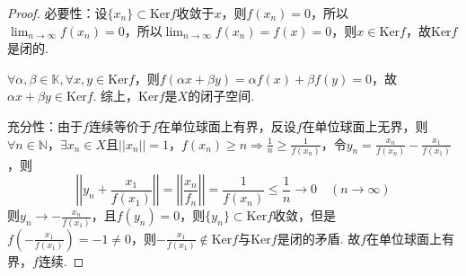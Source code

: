 \documentclass[12pt, a4paper, oneside]{ctexart}
\let\leq=\leqslant %
\let\geq=\geqslant %
\def\N{\mathbb{N}}          %
\def\K{\mathbb{K}}          %
\def\ker{\mathrm{Ker}}      %
\begin{document}
\begin{proof}
    必要性：设$\{x_n\}\subset \ker f$收敛于$x$，则$f(x_n) = 0$，所以$\lim_{n\to\infty}f(x_n) = 0$，所以$\lim_{n\to\infty}f(x_n) = f(x) = 0$，则$x\in \ker f$，故$\ker f$是闭的.

    $\forall \alpha,\beta\in \K,\forall x, y\in \ker f$，则$f(\alpha x+\beta y) = \alpha f(x) + \beta f(y) = 0$，故$\alpha x+\beta y\in \ker f$. 综上，$\ker f$是$X$的闭子空间.

    充分性：由于$f$连续等价于$f$在单位球面上有界，反设$f$在单位球面上无界，则$\forall n\in \N$，$\exists x_n\in X$且$||x_n|| = 1$，$f(x_n) \geq n\Rightarrow \frac{1}{n}\geq \frac{1}{f(x_n)}$，令$y_n = \frac{x_n}{f(x_n)} - \frac{x_1}{f(x_1)}$，则
    \begin{equation*}
        \left|\left|y_n+\frac{x_1}{f(x_1)}\right|\right| = \left|\left|\frac{x_n}{f_n}\right|\right| = \frac{1}{f(x_n)}\leq \frac{1}{n}\to 0\quad(n\to\infty)
    \end{equation*}
    则$y_n\to-\frac{x_n}{f(x_1)}$，且$f(y_n) = 0$，则$\{y_n\}\subset \ker f$收敛，但是$f(-\frac{x_1}{f(x_1)}) = -1\neq 0$，则$-\frac{x_1}{f(x_1)}\notin \ker f$与$\ker f$是闭的矛盾. 故$f$在单位球面上有界，$f$连续.
\end{proof}

\iffalse
\centerline{
    \texttt{[image: figure.png]}
}
\renewcommand\arraystretch{0.8} %
\begin{table}[!htbp] %
    \centering %
    \begin{tabular}{p{1cm}<{\centering}p{1cm}<{\centering}p{3cm}<{\centering}p{5cm}<{\centering}} %
        \toprule
        $x_i$ & $f[x_1]$ & $f[x_i,x_{i+1}]$ & $f[x_i,x_{i+1},x_{i+2}]$ \\
        \midrule
        $x_0$ & $f(x_0)$ &                  &                          \\
        $x_0$ & $f(x_0)$ & $f'(x_0)$        &                          \\
        $x_0$ & $f(x_1)$ & $\frac{f(x_1)-f(x_0)}{x_1-x_0}$ & $\frac{f(x_1)-f(x_0)}{(x_1-x_0)^2}-\frac{f'(x_0)}{x_1-x_0}$\\
        \bottomrule
    \end{tabular}
\end{table}

\def\Log{\text{Log}} %
$\Log$ %
\fi
\end{document}
